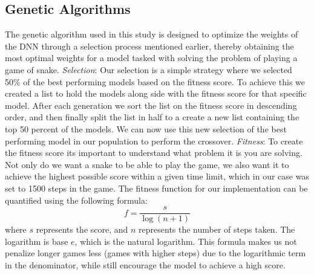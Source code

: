 \documentclass{article}
\begin{document}
\subsection{Genetic Algorithms}
The  genetic algorithm used in this study is designed to optimize the weights of the DNN through a selection process mentioned earlier, thereby obtaining the most optimal weights for a model tasked with solving the problem of playing a game of snake.
\newline
\newline
\textit{Selection}:
Our selection is a simple strategy where we selected 50\% of the best performing models based on the fitness score. 
To achieve this we created a list to hold the models along side with the fitness score for that specific model. After each generation we sort the list on the fitness score in descending order, and then finally split the list in half to a create  a new list containing the top 50 percent of the models. We can now use this new selection of the best performing model in our population to perform the crossover.
\newline
\newline
\textit{Fitness}:
To create the fitness score its important to understand what problem it is you are solving.
Not only do we want a snake to be able to play the game, we also want it to achieve the highest possible score within a given time limit, which in our case was set to 1500 steps in the game. 
The fitness function for our implementation can be quantified using the following formula:
\begin{equation}
    f = \frac{s}{\log(n + 1)}
\end{equation}
where \( s \) represents the score, and \( n \) represents the number of steps taken. The logarithm is base \( e \), which is the natural logarithm. This formula makes us not penalize longer games less (games with higher steps) due to the logarithmic term in the denominator, while still encourage the model to achieve a high score.
\end{document}
